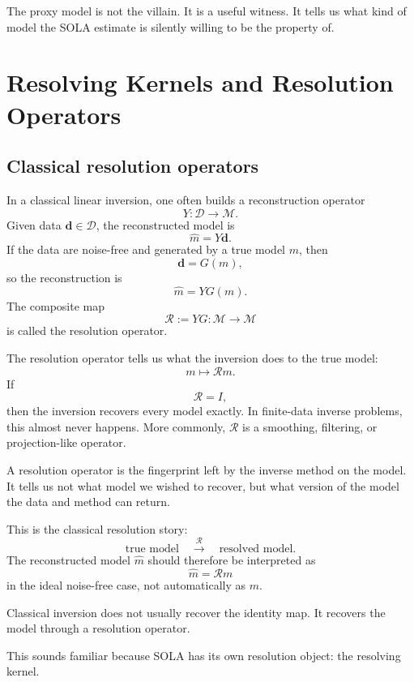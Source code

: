 \documentclass[11pt,openany]{book}
\theoremstyle{definition}
\theoremstyle{remark}
\newcommand{\M}{\mathcal M}
\newcommand{\D}{\mathcal D}
\begin{document}
The proxy model is not the villain. It is a useful witness. It tells us what kind of model the SOLA
estimate is silently willing to be the property of.

\chapter{Resolving Kernels and Resolution Operators}

\section{Classical resolution operators}

In a classical linear inversion, one often builds a reconstruction operator
\[
  Y:\D\to\M.
\]
Given data \(\mathbf d\in\D\), the reconstructed model is
\[
  \hat m=Y\mathbf d.
\]
If the data are noise-free and generated by a true model \(m\), then
\[
  \mathbf d=G(m),
\]
so the reconstruction is
\[
  \hat m=YG(m).
\]
The composite map
\[
  \mathcal R:=YG:\M\to\M
\]
is called the resolution operator.

The resolution operator tells us what the inversion does to the true model:
\[
  m
  \longmapsto
  \mathcal R m.
\]
If
\[
  \mathcal R=I,
\]
then the inversion recovers every model exactly. In finite-data inverse problems, this almost
never happens. More commonly, \(\mathcal R\) is a smoothing, filtering, or projection-like
operator.

\begin{intuitionbox}
A resolution operator is the fingerprint left by the inverse method on the model. It tells us not
what model we wished to recover, but what version of the model the data and method can return.
\end{intuitionbox}

This is the classical resolution story:
\[
  \text{true model}
  \quad
  \xrightarrow{\;\mathcal R\;}
  \quad
  \text{resolved model}.
\]
The reconstructed model \(\hat m\) should therefore be interpreted as
\[
  \hat m=\mathcal R m
\]
in the ideal noise-free case, not automatically as \(m\).

\begin{warningbox}
Classical inversion does not usually recover the identity map. It recovers the model through a
resolution operator.
\end{warningbox}

This sounds familiar because SOLA has its own resolution object: the resolving kernel.
\end{document}
